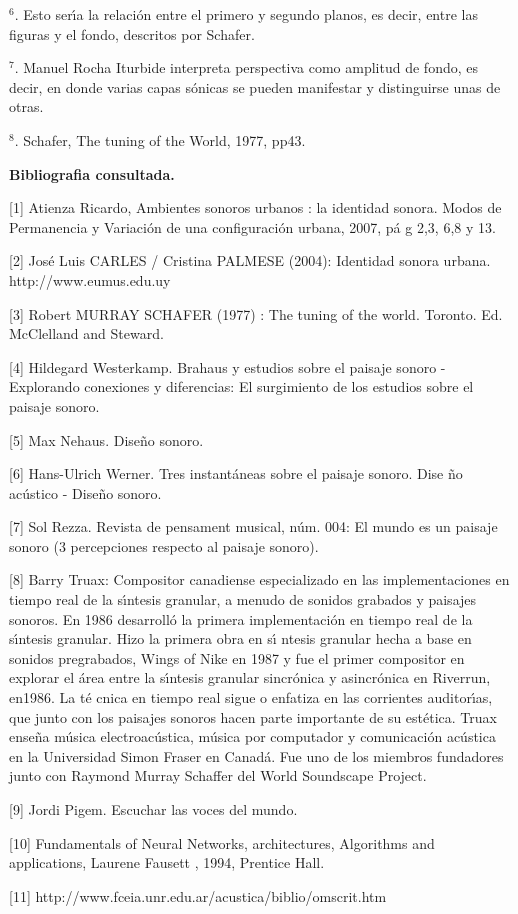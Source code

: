 $^{6}$. Esto ser\'{\i}a la relaci\'{o}n entre el primero y segundo planos,
es decir, entre las figuras y el fondo, descritos por Schafer.

$^{7}$. Manuel Rocha Iturbide interpreta perspectiva como amplitud de fondo,
es decir, en donde varias capas s\'{o}nicas se pueden manifestar y
distinguirse unas de otras.

$^{8}$. Schafer, The tuning of the World, 1977, pp43.

\textbf{Bibliografia consultada.}

[1] Atienza Ricardo, Ambientes sonoros urbanos : la identidad sonora. Modos
de Permanencia y Variaci\'{o}n de una configuraci\'{o}n urbana, 2007, p\'{a}%
g 2,3, 6,8 y 13.

[2] Jos\'{e} Luis CARLES / Cristina PALMESE (2004): Identidad sonora urbana.
http://www.eumus.edu.uy

[3] Robert MURRAY SCHAFER (1977) : The tuning of the world. Toronto. Ed.
McClelland and Steward.

[4] Hildegard Westerkamp. Brahaus y estudios sobre el paisaje sonoro -
Explorando conexiones y diferencias: El surgimiento de los estudios sobre el
paisaje sonoro.

[5] Max Nehaus. Dise\~{n}o sonoro.

[6] Hans-Ulrich Werner. Tres instant\'{a}neas sobre el paisaje sonoro. Dise%
\~{n}o ac\'{u}stico - Dise\~{n}o sonoro.

[7] Sol Rezza. Revista de pensament musical, n\'{u}m. 004: El mundo es un
paisaje sonoro (3 percepciones respecto al paisaje sonoro).

[8] Barry Truax: Compositor canadiense especializado en las implementaciones
en tiempo real de la s\'{\i}ntesis granular, a menudo de sonidos grabados y
paisajes sonoros. En 1986 desarroll\'{o} la primera implementaci\'{o}n en
tiempo real de la s\'{\i}ntesis granular. Hizo la primera obra en s\'{\i}%
ntesis granular hecha a base en sonidos pregrabados, Wings of Nike en 1987 y
fue el primer compositor en explorar el \'{a}rea entre la s\'{\i}ntesis
granular sincr\'{o}nica y asincr\'{o}nica en Riverrun, en1986. La t\'{e}%
cnica en tiempo real sigue o enfatiza en las corrientes auditor\'{\i}as, que
junto con los paisajes sonoros hacen parte importante de su est\'{e}tica.
Truax ense\~{n}a m\'{u}sica electroac\'{u}stica, m\'{u}sica por computador y
comunicaci\'{o}n ac\'{u}stica en la Universidad Simon Fraser en Canad\'{a}.
Fue uno de los miembros fundadores junto con Raymond Murray Schaffer del
World Soundscape Project.

[9] Jordi Pigem. Escuchar las voces del mundo.

[10] Fundamentals of Neural Networks, architectures, Algorithms and
applications, Laurene Fausett , 1994, Prentice Hall.\

[11] http://www.fceia.unr.edu.ar/acustica/biblio/omscrit.htm

\bigskip

\qquad

\qquad

\begin{center}
\bigskip
\end{center}

% 
